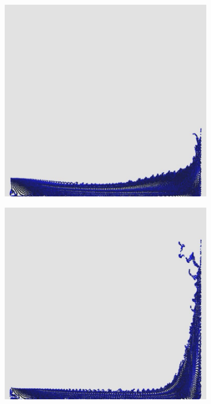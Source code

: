 \documentclass[12pt,a4paper,dvipsnames]{article}
\begin{document}
\begin{figure}[!ht]
\begin{subfigure}[!h]{0.3\textwidth}
	\end{subfigure}
	\begin{subfigure}[!h]{0.3\textwidth} \centering
		\includegraphics[width=\textwidth]{DB/DB-004.jpg}
	\end{subfigure}
	\begin{subfigure}[!h]{0.3\textwidth} \centering
		\includegraphics[width=\textwidth]{DB/DB-005.jpg}

\end{subfigure}
\end{figure}
\end{document}
